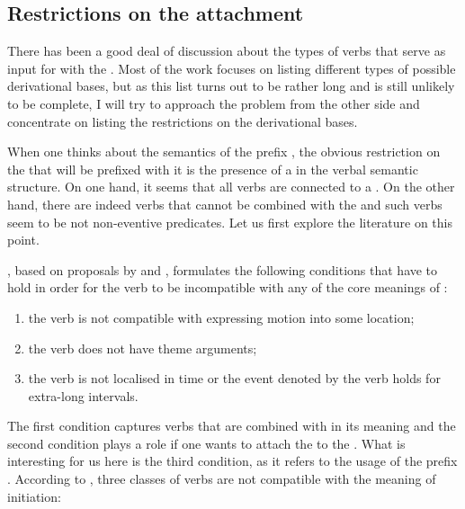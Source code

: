 \subsection{Restrictions on the attachment}
There has been a good deal of discussion about the types of verbs that serve as input for  with the   \citep{Isachenko:60, Zemskaja:55, Sheljakin:69, Zaliznjak:95, Braginsky:08}. Most of the work focuses on listing different types of possible derivational bases, but as this list turns out to be rather long and is still unlikely to be complete, I will try to approach the problem from the other side and concentrate on listing the restrictions on the derivational bases.

When one thinks about the  semantics of the prefix , the obvious restriction on the  that will be prefixed with it is the presence of a  in the verbal semantic structure. On one hand, it seems that all verbs are connected to a . On the other hand, there are indeed verbs that cannot be combined with the   and such verbs seem to be not non-eventive predicates. Let us first explore the literature on this point.

\citet[275]{Braginsky:08}, based on proposals by \citet{Sheljakin:69} and \citet{Paducheva:96}, formulates the following conditions that have to hold in order for the verb to be incompatible with any of the core meanings of :
\begin{enumerate}
\item the verb is not compatible with expressing motion into some location;
\item the verb does not have theme arguments;
\item the verb is not localised in time or the event denoted by the verb holds for extra-long intervals.
\end{enumerate}

The first condition captures verbs that are combined with  in its  meaning and the second condition plays a role if one wants to attach the   to the . What is interesting for us here is the third condition, as it refers to the  usage of the prefix . According to \citet{Paducheva:96}, three classes of verbs are not compatible with the meaning of initiation:

